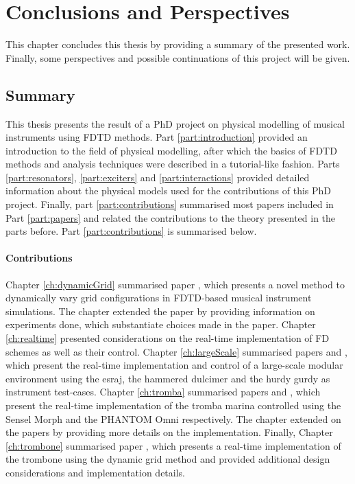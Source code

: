 \chapter{Conclusions and Perspectives}\label{ch:conclusion}
This chapter concludes this thesis by providing a summary of the presented work. Finally, some perspectives and possible continuations of this project will be given.



\section{Summary}
This thesis presents the result of a PhD project on physical modelling of musical instruments using FDTD methods.
Part \ref{part:introduction} provided an introduction to the field of physical modelling, after which the basics of FDTD methods and analysis techniques were described in a tutorial-like fashion. Parts \ref{part:resonators}, \ref{part:exciters} and \ref{part:interactions} provided detailed information about the physical models used for the contributions of this PhD project. Finally, part \ref{part:contributions} summarised most papers included in Part \ref{part:papers} and related the contributions to the theory presented in the parts before. Part \ref{part:contributions} is summarised below.
\subsubsection{Contributions}
Chapter \ref{ch:dynamicGrid} summarised paper \citeP[G], which presents a novel method to dynamically vary grid configurations in FDTD-based musical instrument simulations. The chapter extended the paper by providing information on experiments done, which substantiate choices made in the paper. 
Chapter \ref{ch:realtime} presented considerations on the real-time implementation of FD schemes as well as their control. 
Chapter \ref{ch:largeScale} summarised papers \citeP[A] and \citeP[B], which present the real-time implementation and control of a large-scale modular environment using the esraj, the hammered dulcimer and the hurdy gurdy as instrument test-cases. 
Chapter \ref{ch:tromba} summarised papers \citeP[D] and \citeP[E], which present the real-time implementation of the tromba marina controlled using the Sensel Morph and the PHANTOM Omni respectively. The chapter extended on the papers by providing more details on the implementation. Finally, Chapter \ref{ch:trombone} summarised paper \citeP[H], which presents a real-time implementation of the trombone using the dynamic grid method and provided additional design considerations and implementation details.


